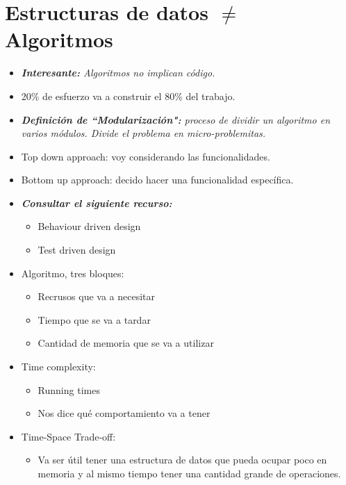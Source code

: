 \section{Estructuras de datos $\neq$ Algoritmos}
\begin{itemize}
    \item \emph{\textbf{Interesante:} Algoritmos no implican código. }
    \item 20\% de esfuerzo va a construir el 80\% del trabajo.
    \item \emph{\textbf{Definición de ``Modularización":} proceso de dividir un algoritmo en varios módulos. Divide el problema en micro-problemitas.}
    \item Top down approach: voy considerando las funcionalidades.
    \item Bottom up approach: decido hacer una funcionalidad específica.
    \item \emph{\textbf{Consultar el siguiente recurso:}} 
        \begin{itemize}
            \item Behaviour driven design 
            \item Test driven design
        \end{itemize}
    
    \item Algoritmo, tres bloques:
        \begin{itemize}
            \item Recrusos que va a necesitar 
            \item Tiempo que se va a tardar 
            \item Cantidad de memoria que se va a utilizar
        \end{itemize}
    
    \item Time complexity:
        \begin{itemize}
            \item Running times 
            \item Nos dice qué comportamiento va a tener 
        \end{itemize}
    
    \item Time-Space Trade-off:
        \begin{itemize}
            \item Va ser útil tener una estructura de datos que pueda ocupar poco en memoria y al mismo tiempo tener una cantidad grande de operaciones.
        \end{itemize}
    

\end{itemize}
